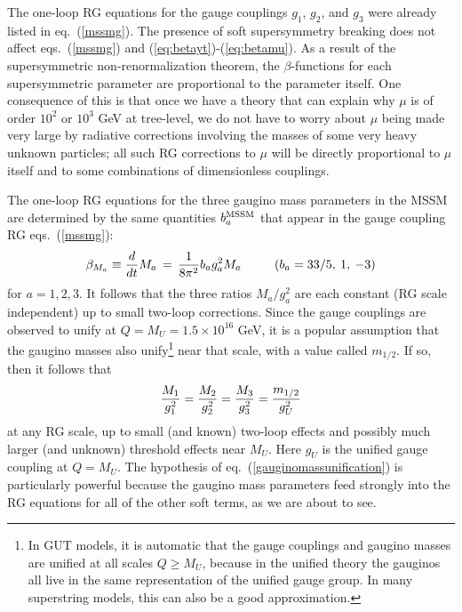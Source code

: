 \documentclass[11pt]{article}
\def\beq{\begin{eqnarray}}
\def\eeq{\end{eqnarray}}
\begin{document}
The one-loop RG equations for the gauge couplings $g_1$, $g_2$, and $g_3$
were already listed in eq.~(\ref{mssmg}).  The presence of soft
supersymmetry breaking does not affect eqs.~(\ref{mssmg}) and
(\ref{eq:betayt})-(\ref{eq:betamu}). As a result of the
supersymmetric non-renormalization theorem, the $\beta$-functions  
for each supersymmetric
parameter are proportional to the parameter itself.  One consequence of
this is that once we have a theory that can explain why $\mu$ is of order
$10^2$ or $10^3$ GeV at tree-level, we do not have to worry about $\mu$
being made very large by radiative corrections involving the masses of
some very heavy unknown particles; all such RG corrections to $\mu$ will
be directly proportional to $\mu$ itself and to some combinations of
dimensionless couplings. 

The one-loop RG equations for the three gaugino mass parameters in the
MSSM are determined by the same quantities $b_a^{\rm MSSM}$ that appear in
the gauge coupling RG eqs.~(\ref{mssmg}): 
\beq
\beta_{M_a} \equiv
{d\over dt} M_a \,=\, {1\over 8\pi^2} b_a g_a^2 M_a\qquad\>\>\>
(b_a = 33/5, \>1,\>-3)
\label{gauginomassrge}
\eeq
for $a=1,2,3$. It follows that the three ratios $M_a/g_a^2$ are each
constant (RG scale independent) up to small two-loop corrections.  Since
the gauge couplings are observed to unify at $Q = M_U = 1.5 \times 10^{16}$
GeV, it is a popular assumption that the gaugino masses also
unify\footnote{In GUT models, it is automatic that the gauge couplings
and gaugino masses are unified at all scales $Q\geq M_U$, because in the
unified theory the gauginos all live in the same representation of the
unified gauge group. In many superstring models, this can also be a good
approximation.} near that scale, with a value called $m_{1/2}$. 
If so, then it follows that
\beq
{M_1 \over g_1^2} =
{M_2 \over g_2^2} =
{M_3 \over g_3^2} = {m_{1/2} \over g_U^2}
\label{gauginomassunification}
\eeq
at any RG scale, up to small (and known) two-loop effects and possibly
much larger (and unknown) threshold effects near $M_U$. Here $g_U$ is
the unified gauge coupling at $Q = M_U$. The hypothesis of
eq.~(\ref{gauginomassunification}) is particularly powerful because the
gaugino mass parameters feed strongly into the RG equations for all of the
other soft terms, as we are about to see. 
\end{document}
